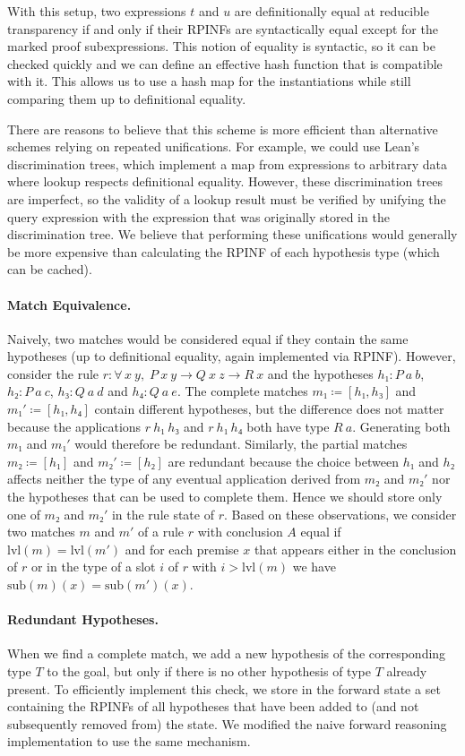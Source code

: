\documentclass[runningheads,leqno]{llncs}
\newcommand{\para}[1]{\paragraph{\bfseries\upshape #1}}
\newcommand{\All}[2]{\ensuremath{\forall\, #1,\; #2}}
\newcommand{\sub}{\ensuremath{\mathrm{sub}}}
\newcommand{\lvl}{\ensuremath{\mathrm{lvl}}}
\begin{document}
With this setup, two expressions $t$ and $u$ are definitionally equal at reducible transparency if and only if their RPINFs are syntactically equal except for the marked proof subexpressions.
This notion of equality is syntactic, so it can be checked quickly and we can define an effective hash function that is compatible with it.
This allows us to use a hash map for the instantiations while still comparing them up to definitional equality.

There are reasons to believe that this scheme is more efficient than alternative schemes relying on repeated unifications.
For example, we could use Lean's discrimination trees, which implement a map from expressions to arbitrary data where lookup respects definitional equality.
However, these discrimination trees are imperfect, so the validity of a lookup result must be verified by unifying the query expression with the expression that was originally stored in the discrimination tree.
We believe that performing these unifications would generally be more expensive than calculating the RPINF of each hypothesis type (which can be cached).

\para{Match Equivalence.}
Naively, two matches would be considered equal if they contain the same hypotheses (up to definitional equality, again implemented via RPINF).
However, consider the rule $r : \All{x~y}{P~x~y → Q~x~z → R~x}$ and the hypotheses $h₁ : P~a~b$, $h₂ : P~a~c$, $h₃ : Q~a~d$ and $h₄ : Q~a~e$.
The complete matches $m₁ ≔ [h₁, h₃]$ and $m₁' ≔ [h₁, h₄]$ contain different hypotheses, but the difference does not matter because the applications $r~h₁~h₃$ and $r~h₁~h₄$ both have type $R~a$.
Generating both $m₁$ and $m₁'$ would therefore be redundant.
Similarly, the partial matches $m₂ ≔ [h₁]$ and $m₂' ≔ [h₂]$ are redundant because the choice between $h₁$ and $h₂$ affects neither the type of any eventual application derived from $m₂$ and $m₂'$ nor the hypotheses that can be used to complete them.
Hence we should store only one of $m₂$ and $m₂'$ in the rule state of $r$.
Based on these observations, we consider two matches $m$ and $m'$ of a rule $r$ with conclusion $A$ equal if $\lvl(m) = \lvl(m')$ and for each premise $x$ that appears either in the conclusion of $r$ or in the type of a slot $i$ of $r$ with $i > \lvl(m)$ we have $\sub(m)(x) = \sub(m')(x)$.

\para{Redundant Hypotheses.}
When we find a complete match, we add a new hypothesis of the corresponding type $T$ to the goal, but only if there is no other hypothesis of type $T$ already present.
To efficiently implement this check, we store in the forward state a set containing the RPINFs of all hypotheses that have been added to (and not subsequently removed from) the state.
We modified the naive forward reasoning implementation to use the same mechanism.
\end{document}
